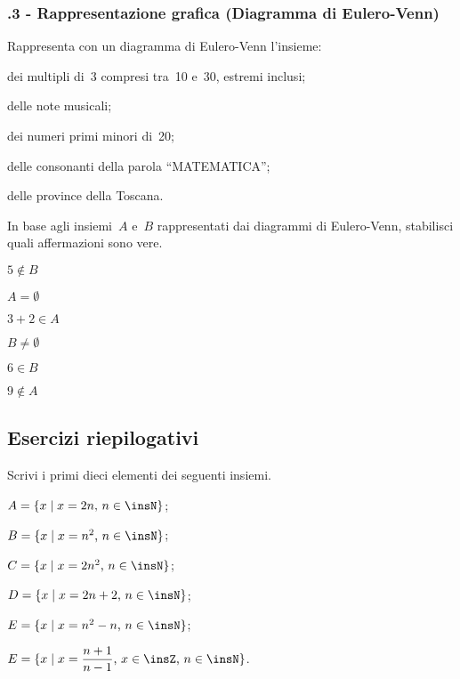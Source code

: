 \subsubsection*{\thechapter.3 - Rappresentazione grafica (Diagramma di Eulero-Venn)}

\begin{esercizio}
\label{ese:6.21}
Rappresenta con un diagramma di Eulero-Venn l'insieme:
\begin{enumeratea}
\item dei multipli di~3 compresi tra~10 e~30, estremi inclusi;
\item delle note musicali;
\item dei numeri primi minori di~20;
\item delle consonanti della parola ``MATEMATICA'';
\item delle province della Toscana.
\end{enumeratea}
\end{esercizio}

\begin{esercizio}
\label{ese:6.22}
In base agli insiemi~$A$ e~$B$ rappresentati dai diagrammi di Eulero-Venn, stabilisci quali affermazioni sono vere.
\begin{multicols}{2}
\TabPositions{2.5cm}
\begin{enumeratea}
\item $5\notin B$\tab\boxV\quad\boxF
\item $A=\emptyset $\tab\boxV\quad\boxF
\item $3+2\in A$\tab\boxV\quad\boxF
\item $B\neq \emptyset $\tab\boxV\quad\boxF
\item $6\in B$\tab\boxV\quad\boxF
\item $9\notin A$\tab\boxV\quad\boxF
\end{enumeratea}
\columnbreak

\end{multicols}
\end{esercizio}

\subsection{Esercizi riepilogativi}

\begin{esercizio}
Scrivi i primi dieci elementi dei seguenti insiemi.
\begin{enumeratea}
\spazielenx
\item $A=\{x\mid x=2n\text{, }n\in\insN\}$;
\item $B=\{x\mid x=n^{2}\text{, }n\in\insN\}$;
\item $C=\{x\mid x=2n^{2}\text{, }n\in\insN\}$;
\item $D=\{x\mid x=2n+2\text{, }n\in\insN\}$;
\item $E=\{x\mid x=n^{2}-n\text{, }n\in\insN\}$;
\item $E=\{x\mid x=\dfrac{n+1}{n-1}\text{, }x\in\insZ\text{, }n\in\insN\}$.
\end{enumeratea}
\end{esercizio}

